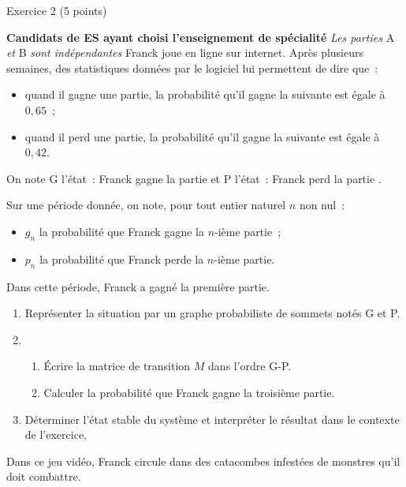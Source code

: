 
\begin{h2}Exercice 2 (5 points)\end{h2}
\textbf{Candidats de ES ayant  choisi l'enseignement de spécialité}
\medbreak
\emph{Les parties} A \emph{et} B \emph{sont indépendantes}
\medbreak
Franck joue en ligne sur internet.
\medbreak
{}
\medbreak
Après plusieurs semaines, des statistiques données par le logiciel lui permettent de dire que~:
\begin{indent}
     \begin{itemize}
          \item quand il gagne une partie, la probabilité qu'il gagne la suivante est égale à $0,65$~;
          \item quand il perd une partie, la probabilité qu'il gagne la suivante est égale à $0,42$.
     \end{itemize}
\end{indent}
\medbreak
On note G l'état~: \og Franck gagne la partie \fg{} et P l'état~: \og Franck perd la partie \fg.
\par
Sur une période donnée, on note, pour tout entier naturel $n$ non nul~:
\begin{indent}
     \begin{itemize}
          \item $g_n$ la probabilité que Franck gagne la $n$-ième partie~;
          \item $p_n$ la probabilité que Franck perde la $n$-ième partie.
     \end{itemize}
\end{indent}
\medbreak
Dans cette période, Franck a gagné la première partie.
\medbreak
\begin{enumerate}
     \item Représenter la situation par un graphe probabiliste de sommets notés G et P.
     \item
     \begin{enumerate}[label=\alph*.]
          \item Écrire la matrice de transition $M$ dans l'ordre G-P.
          \item Calculer la probabilité que Franck gagne la troisième partie.
     \end{enumerate}
     \item  Déterminer l'état stable du système et interpréter le résultat dans le contexte de l'exercice,
\end{enumerate}
\bigbreak
{}
\medbreak
Dans ce jeu vidéo, Franck circule dans des catacombes infestées de monstres qu'il doit combattre.
